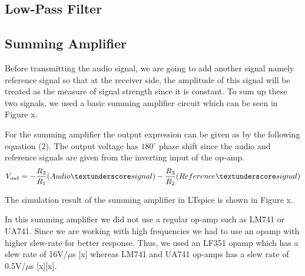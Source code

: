\documentclass[conference]{IEEEtran}
\begin{document}
\subsection{Low-Pass Filter}
\subsection{Summing Amplifier}
Before transmitting the audio signal, we are going to add another signal namely reference signal so that at the receiver side, the amplitude of this signal will be treated as the measure of signal strength since it is constant. To sum up these two signals, we used a basic summing amplifier circuit which can be seen in Figure x. \\
\par For the summing amplifier the output expression can be given as by the following equation (2). The output voltage has \(180^\circ\) phase shift since the audio and reference signals are given from the inverting input of the op-amp.  
\begin{equation}\label{eq:3}
         V_{out} = -\frac{R_3}{R_1} \mbox{(Audio\textunderscore signal)} - \frac{R_3}{R_2} \mbox{(Reference\textunderscore signal)}
 \end{equation}
 \par The simulation result of the summing amplifier in LTspice is shown in Figure x. \\
 \par In this summing amplifier we did not use a regular op-amp such as LM741 or UA741. Since we are working with high frequencies we had to use an opamp with higher slew-rate for better response. Thus, we used an LF351 opamp which has a slew rate of 16V/\(\mu\)s [x] whereas LM741 and UA741 op-amps has a slew rate of 0.5V/\(\mu\)s [x][x].
\end{document}
